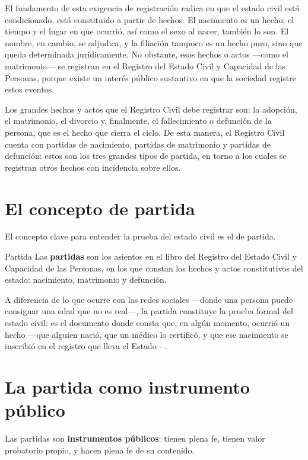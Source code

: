 \documentclass[12pt,oneside]{book}
\begin{document}
El fundamento de esta exigencia de registración radica en que el estado civil está condicionado, está constituido a partir de hechos. El nacimiento es un hecho; el tiempo y el lugar en que ocurrió, así como el sexo al nacer, también lo son. El nombre, en cambio, se adjudica, y la filiación tampoco es un hecho puro, sino que queda determinada jurídicamente. No obstante, esos hechos o actos —como el matrimonio— se registran en el Registro del Estado Civil y Capacidad de las Personas, porque existe un interés público sustantivo en que la sociedad registre estos eventos.

Los grandes hechos y actos que el Registro Civil debe registrar son: la adopción, el matrimonio, el divorcio y, finalmente, el fallecimiento o defunción de la persona, que es el hecho que cierra el ciclo. De esta manera, el Registro Civil cuenta con partidas de nacimiento, partidas de matrimonio y partidas de defunción: estos son los tres grandes tipos de partida, en torno a los cuales se registran otros hechos con incidencia sobre ellos.

\section{El concepto de partida}

El concepto clave para entender la prueba del estado civil es el de partida.

\begin{definition}{Partida}
Las \textbf{partidas} son los asientos en el libro del Registro del Estado Civil y Capacidad de las Personas, en los que constan los hechos y actos constitutivos del estado: nacimiento, matrimonio y defunción.
\end{definition}

\begin{note}
A diferencia de lo que ocurre con las redes sociales —donde una persona puede consignar una edad que no es real—, la partida constituye la prueba formal del estado civil: es el documento donde consta que, en algún momento, ocurrió un hecho —que alguien nació, que un médico lo certificó, y que ese nacimiento se inscribió en el registro que lleva el Estado—.
\end{note}

\section{La partida como instrumento público}

\begin{important}
Las partidas son \textbf{instrumentos públicos}: tienen plena fe, tienen valor probatorio propio, y hacen plena fe de su contenido.
\end{important}
\end{document}
